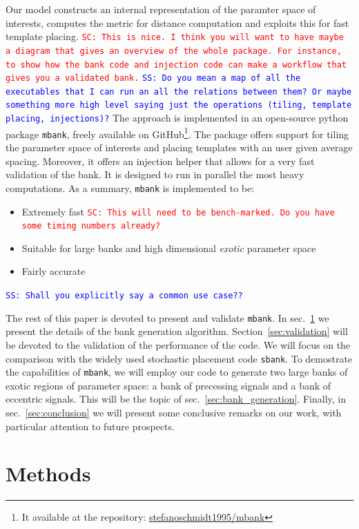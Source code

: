 \documentclass[twocolumn,showpacs,preprintnumbers,nofootinbib,prd,
superscriptaddress,10pt]{revtex4-1}
\newcommand{\stefano}[1]{{\textcolor{blue}{\texttt{SS: #1}} }}
\newcommand{\sarah}[1]{{\textcolor{red}{\texttt{SC: #1}} }}
\begin{document}
Our model constructs an internal representation of the paramter space of interests, computes the metric for distance computation and exploits this for fast template placing. \sarah{This is nice. I think you will want to have maybe a diagram that gives an overview of the whole package. For instance, to show how the bank code and injection code can make a workflow that gives you a validated bank.} \stefano{Do you mean a map of all the executables that I can run an all the relations between them? Or maybe something more high level saying just the operations (tiling, template placing, injections)?}
The approach is implemented in an open-source python package \texttt{mbank}, freely available on GitHub\footnote{
It available at the repository: \href{https://github.com/stefanoschmidt1995/mbank}{stefanoschmidt1995/mbank}}.
The package offers support for tiling the parameter space of interests and placing templates with an user given average spacing. Moreover, it offers an injection helper that allows for a very fast validation of the bank.
It is designed to run in parallel the most heavy computations.
As a summary, \texttt{mbank} is implemented to be:
\begin{itemize}
	\item Extremely fast \sarah{This will need to be bench-marked. Do you have some timing numbers already?}
	\item Suitable for large banks and high dimensional {\it exotic} parameter space
	\item Fairly accurate
\end{itemize}
\stefano{Shall you explicitly say a common use case??}

The rest of this paper is devoted to present and validate \texttt{mbank}.
In sec.~\ref{sec:methods} we present the details of the bank generation algorithm.
Section~\ref{sec:validation} will be devoted to the validation of the performance of the code. We will focus on the comparison with the widely used stochastic placement code \texttt{sbank}.
To demostrate the capabilities of \texttt{mbank}, we will employ our code to generate two large banks of exotic regions of parameter space: a bank of precessing signals and a bank of eccentric signals. This will be the topic of sec.~\ref{sec:bank_generation}.
Finally, in sec.~\ref{sec:conclusion} we will present some conclusive remarks on our work, with particular attention to future prospects.

\section{Methods} \label{sec:methods}
\end{document}
